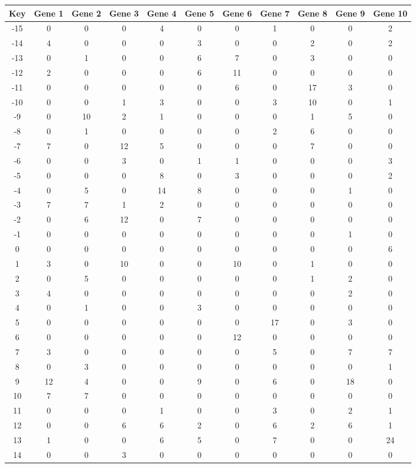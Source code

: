 \begin{tabular}{|c|c|c|c|c|c|c|c|c|c|c|}
\hline
Key & Gene 1 & Gene 2 & Gene 3 & Gene 4 & Gene 5 & Gene 6 & Gene 7 & Gene 8 & Gene 9 & Gene 10 \\
\hline
-15 & 0 & 0 & 0 & 4 & 0 & 0 & 1 & 0 & 0 & 2 \\
-14 & 4 & 0 & 0 & 0 & 3 & 0 & 0 & 2 & 0 & 2 \\
-13 & 0 & 1 & 0 & 0 & 6 & 7 & 0 & 3 & 0 & 0 \\
-12 & 2 & 0 & 0 & 0 & 6 & 11 & 0 & 0 & 0 & 0 \\
-11 & 0 & 0 & 0 & 0 & 0 & 6 & 0 & 17 & 3 & 0 \\
-10 & 0 & 0 & 1 & 3 & 0 & 0 & 3 & 10 & 0 & 1 \\
-9 & 0 & 10 & 2 & 1 & 0 & 0 & 0 & 1 & 5 & 0 \\
-8 & 0 & 1 & 0 & 0 & 0 & 0 & 2 & 6 & 0 & 0 \\
-7 & 7 & 0 & 12 & 5 & 0 & 0 & 0 & 7 & 0 & 0 \\
-6 & 0 & 0 & 3 & 0 & 1 & 1 & 0 & 0 & 0 & 3 \\
-5 & 0 & 0 & 0 & 8 & 0 & 3 & 0 & 0 & 0 & 2 \\
-4 & 0 & 5 & 0 & 14 & 8 & 0 & 0 & 0 & 1 & 0 \\
-3 & 7 & 7 & 1 & 2 & 0 & 0 & 0 & 0 & 0 & 0 \\
-2 & 0 & 6 & 12 & 0 & 7 & 0 & 0 & 0 & 0 & 0 \\
-1 & 0 & 0 & 0 & 0 & 0 & 0 & 0 & 0 & 1 & 0 \\
0 & 0 & 0 & 0 & 0 & 0 & 0 & 0 & 0 & 0 & 6 \\
1 & 3 & 0 & 10 & 0 & 0 & 10 & 0 & 1 & 0 & 0 \\
2 & 0 & 5 & 0 & 0 & 0 & 0 & 0 & 1 & 2 & 0 \\
3 & 4 & 0 & 0 & 0 & 0 & 0 & 0 & 0 & 2 & 0 \\
4 & 0 & 1 & 0 & 0 & 3 & 0 & 0 & 0 & 0 & 0 \\
5 & 0 & 0 & 0 & 0 & 0 & 0 & 17 & 0 & 3 & 0 \\
6 & 0 & 0 & 0 & 0 & 0 & 12 & 0 & 0 & 0 & 0 \\
7 & 3 & 0 & 0 & 0 & 0 & 0 & 5 & 0 & 7 & 7 \\
8 & 0 & 3 & 0 & 0 & 0 & 0 & 0 & 0 & 0 & 1 \\
9 & 12 & 4 & 0 & 0 & 9 & 0 & 6 & 0 & 18 & 0 \\
10 & 7 & 7 & 0 & 0 & 0 & 0 & 0 & 0 & 0 & 0 \\
11 & 0 & 0 & 0 & 1 & 0 & 0 & 3 & 0 & 2 & 1 \\
12 & 0 & 0 & 6 & 6 & 2 & 0 & 6 & 2 & 6 & 1 \\
13 & 1 & 0 & 0 & 6 & 5 & 0 & 7 & 0 & 0 & 24 \\
14 & 0 & 0 & 3 & 0 & 0 & 0 & 0 & 0 & 0 & 0 \\
\hline
\end{tabular}